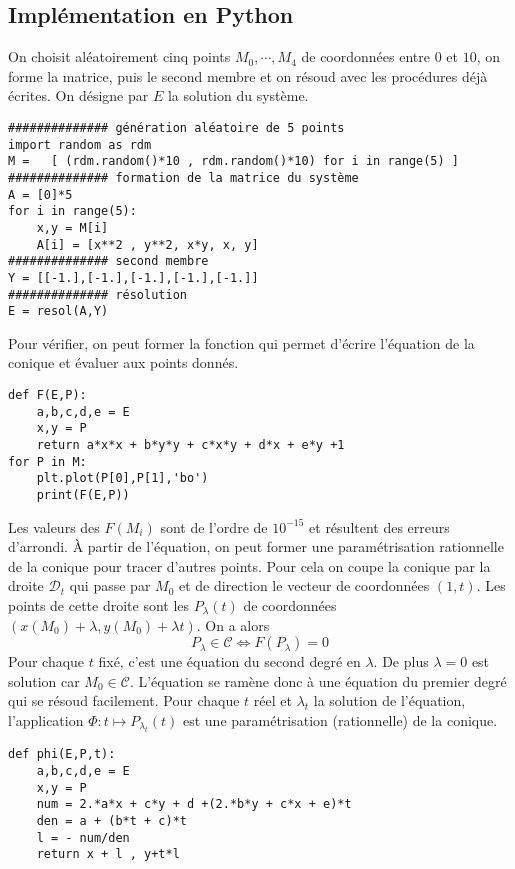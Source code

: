 \subsection{Implémentation en Python}
On choisit aléatoirement cinq points $M_0, \cdots, M_4$ de coordonnées entre $0$ et $10$, on forme la matrice, puis le second membre et on résoud avec les procédures déjà écrites. On désigne par $E$ la solution du système.
\begin{verbatim}
############## génération aléatoire de 5 points
import random as rdm
M =   [ (rdm.random()*10 , rdm.random()*10) for i in range(5) ]
############## formation de la matrice du système
A = [0]*5
for i in range(5):
    x,y = M[i]
    A[i] = [x**2 , y**2, x*y, x, y]
############## second membre
Y = [[-1.],[-1.],[-1.],[-1.],[-1.]]
############## résolution
E = resol(A,Y)
\end{verbatim}
Pour vérifier, on peut former la fonction qui permet d'écrire l'équation de la conique et évaluer aux points donnés.
\begin{verbatim}
def F(E,P):
    a,b,c,d,e = E
    x,y = P
    return a*x*x + b*y*y + c*x*y + d*x + e*y +1
for P in M:
    plt.plot(P[0],P[1],'bo')
    print(F(E,P))
\end{verbatim}
Les valeurs des $F(M_i)$ sont de l'ordre de $10^{-15}$ et résultent des erreurs d'arrondi.\newline
\`A partir de l'équation, on peut former une paramétrisation rationnelle de la conique pour tracer d'autres points. Pour cela on coupe la conique par la droite $\mathcal{D}_t$ qui passe par $M_0$ et de direction le vecteur de coordonnées $(1,t)$. Les points de cette droite sont les $P_\lambda(t)$  de coordonnées $(x(M_0)+\lambda, y(M_0)+\lambda t)$. On a alors
\begin{displaymath}
P_\lambda \in \mathcal{C} \Leftrightarrow F(P_\lambda) = 0  
\end{displaymath}
Pour chaque $t$ fixé, c'est une équation du second degré en $\lambda$. De plus $\lambda=0$ est solution car $M_0\in \mathcal{C}$. L'équation se ramène donc à une équation du premier degré qui se résoud facilement. Pour chaque $t$ réel et $\lambda_t$ la solution de l'équation, l'application $\Phi : t \mapsto P_{\lambda_t}(t)$ est une paramétrisation (rationnelle) de la conique.
\begin{verbatim}
def phi(E,P,t):
    a,b,c,d,e = E
    x,y = P
    num = 2.*a*x + c*y + d +(2.*b*y + c*x + e)*t
    den = a + (b*t + c)*t
    l = - num/den
    return x + l , y+t*l
\end{verbatim}
